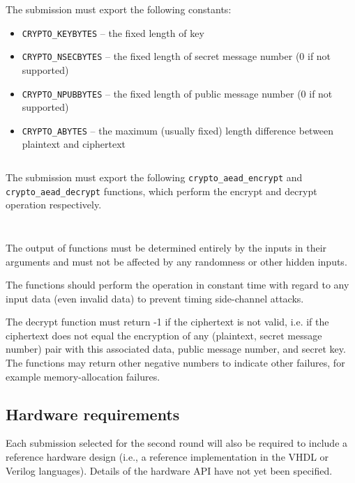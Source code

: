 The submission must export the following constants:

\begin{itemize}
  \item \texttt{CRYPTO\_KEYBYTES} -- the fixed length of key
  \item \texttt{CRYPTO\_NSECBYTES} -- the fixed length of secret message number (0 if not supported)
  \item \texttt{CRYPTO\_NPUBBYTES} -- the fixed length of public message number (0 if not supported)
  \item \texttt{CRYPTO\_ABYTES} -- the maximum (usually fixed) length difference between plaintext and ciphertext
\end{itemize}

\inputminted{c}{code/caesar/constants.c}

The submission must export the following \texttt{crypto\_aead\_encrypt} and \texttt{crypto\_aead\_decrypt} functions, which perform the encrypt and decrypt operation respectively.

\inputminted{c}{code/caesar/encrypt.c}
\inputminted{c}{code/caesar/decrypt.c}

The output of functions must be determined entirely by the inputs in their arguments and must not be affected by any randomness or other hidden inputs.

The functions should perform the operation in constant time with regard to any input data (even invalid data) to prevent timing side-channel attacks.

The decrypt function must return -1 if the ciphertext is not valid, i.e. if the ciphertext does not equal the encryption of any (plaintext, secret message number) pair with this associated data, public message number, and secret key. The functions may return other negative numbers to indicate other failures, for example memory-allocation failures. \cite{crypto-competitions}


\subsection{Hardware requirements}

Each submission selected for the second round will also be required to include a reference hardware design (i.e., a reference implementation in the VHDL or Verilog languages). Details of the hardware API have not yet been specified. \cite{crypto-competitions}
